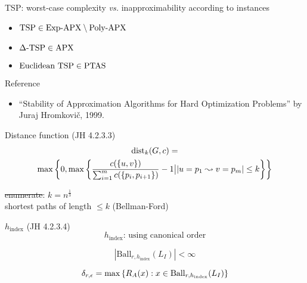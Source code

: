 
\begin{frame}
  TSP: worst-case complexity \emph{vs.} inapproximability according to instances

  \begin{itemize}
	\item $\text{TSP} \in \text{Exp-APX} \setminus \text{Poly-APX}$
	\item $\Delta\text{-TSP} \in \text{APX}{}$
	\item $\text{Euclidean TSP} \in \text{PTAS}{}$
  \end{itemize}

  \begin{alertblock}{Reference}
	\begin{itemize}
	  \item ``Stability of Approximation Algorithms for Hard Optimization Problems'' by Juraj Hromkovi\v{c}, 1999.
	\end{itemize}
  \end{alertblock}
\end{frame}

\begin{frame}
  \begin{exampleblock}{Distance function (JH 4.2.3.3)}
	\begin{gather*}
	  \text{dist}_{k}(G,c) = \\
	  \max\left\{0, \max\left\{ \frac{c(\left\{ u,v \right\})}{\sum_{i=1}^{m} c(\left\{ p_i, p_{i+1} \right\})} - 1 \bigl \lvert |u = p_1 \leadsto v = p_m| \le k \right\}\right\}
	\end{gather*}
  \end{exampleblock}

  \begin{center}
	\sout{enumerate}: $k = n^{\frac{1}{3}}$ \\[5pt]
    shortest paths of length $\le k$ (Bellman-Ford)
  \end{center}
\end{frame}

\begin{frame}
  \begin{exampleblock}{$h_{\text{index}}$ (JH 4.2.3.4)}
	\[
	  h_{\text{index}}\text{: using canonical order}
	\]
  \end{exampleblock}

  \[
	|\text{Ball}_{r, h_{\text{index}}}(L_I)| < \infty
  \]

  \[
	\delta_{r, \epsilon} = \max \left\{ R_A(x): x \in \text{Ball}_{r, h_{\text{index}}}(L_I) \right\}
  \]
\end{frame}

